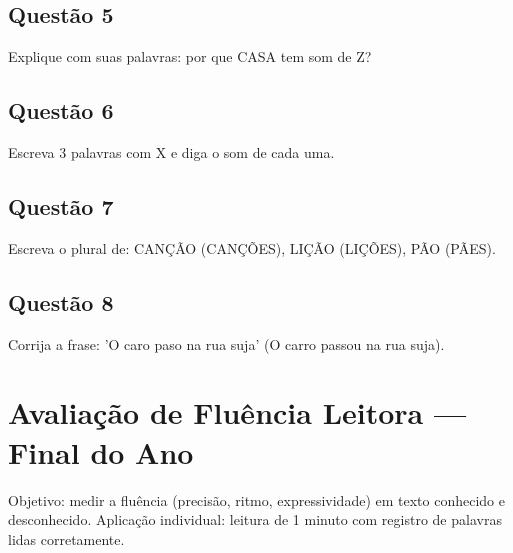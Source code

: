 \begin{center}
  \underline{\hspace{12cm}}
\end{center}

\subsection*{Questão 5}
Explique com suas palavras: por que CASA tem som de Z?

\begin{center}
  \underline{\hspace{12cm}}
\end{center}

\subsection*{Questão 6}
Escreva 3 palavras com X e diga o som de cada uma.

\begin{center}
  \underline{\hspace{12cm}}
\end{center}

\subsection*{Questão 7}
Escreva o plural de: CANÇÃO (CANÇÕES), LIÇÃO (LIÇÕES), PÃO (PÃES).

\begin{center}
  \underline{\hspace{12cm}}
\end{center}

\subsection*{Questão 8}
Corrija a frase: 'O caro paso na rua suja' (O carro passou na rua suja).

\begin{center}
  \underline{\hspace{12cm}}
\end{center}

\clearpage

\section{Avaliação de Fluência Leitora — Final do Ano}

\begin{avaliacao}
Objetivo: medir a fluência (precisão, ritmo, expressividade) em texto conhecido e desconhecido. Aplicação individual: leitura de 1 minuto com registro de palavras lidas corretamente.
\end{avaliacao}

